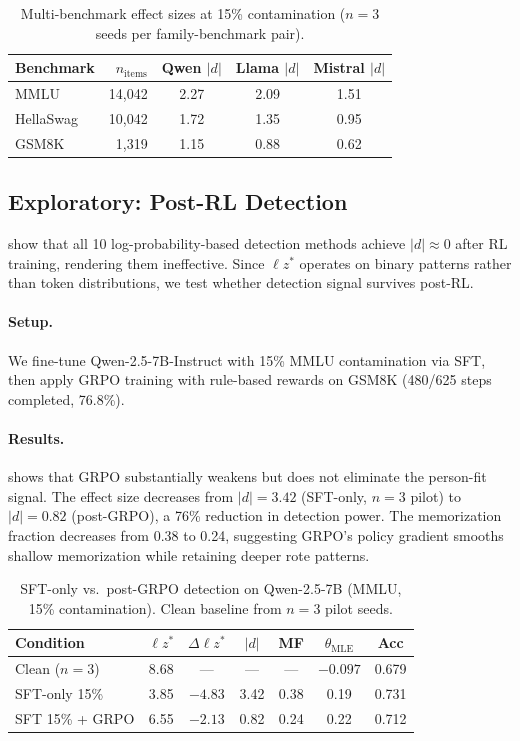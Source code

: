 \documentclass[11pt,a4paper]{article}
\begin{document}
\begin{table}[t]
\centering
\caption{Multi-benchmark effect sizes at 15\% contamination ($n{=}3$ seeds per family-benchmark pair).}
\label{tab:multi-bench}
\small
\begin{tabular}{lrccc}
\toprule
\textbf{Benchmark} & $n_{\text{items}}$ & \textbf{Qwen} $|d|$ & \textbf{Llama} $|d|$ & \textbf{Mistral} $|d|$ \\
\midrule
MMLU & 14,042 & 2.27 & 2.09 & 1.51 \\
HellaSwag & 10,042 & 1.72 & 1.35 & 0.95 \\
GSM8K & 1,319 & 1.15 & 0.88 & 0.62 \\
\bottomrule
\end{tabular}
\end{table}

\subsection{Exploratory: Post-RL Detection}
\label{sec:post-rl}

\citet{wang2025rlcontam} show that all 10 log-probability-based detection methods achieve $|d|{\approx}0$ after RL training, rendering them ineffective.
Since $\ell z^*$ operates on binary patterns rather than token distributions, we test whether detection signal survives post-RL.

\paragraph{Setup.}
We fine-tune Qwen-2.5-7B-Instruct with 15\% MMLU contamination via SFT, then apply GRPO training with rule-based rewards on GSM8K (480/625 steps completed, 76.8\%).

\paragraph{Results.}
 shows that GRPO substantially weakens but does not eliminate the person-fit signal.
The effect size decreases from $|d|{=}3.42$ (SFT-only, $n{=}3$ pilot) to $|d|{=}0.82$ (post-GRPO), a 76\% reduction in detection power.
The memorization fraction decreases from 0.38 to 0.24, suggesting GRPO's policy gradient smooths shallow memorization while retaining deeper rote patterns.

\begin{table}[t]
\centering
\caption{SFT-only vs.\ post-GRPO detection on Qwen-2.5-7B (MMLU, 15\% contamination). Clean baseline from $n{=}3$ pilot seeds.}
\label{tab:post-rl}
\small
\begin{tabular}{lcccccc}
\toprule
\textbf{Condition} & $\ell z^*$ & $\Delta \ell z^*$ & $|d|$ & \textbf{MF} & $\theta_{\text{MLE}}$ & \textbf{Acc} \\
\midrule
Clean ($n{=}3$) & 8.68 & --- & --- & --- & $-0.097$ & 0.679 \\
SFT-only 15\% & 3.85 & $-4.83$ & 3.42 & 0.38 & 0.19 & 0.731 \\
SFT 15\% + GRPO & 6.55 & $-2.13$ & 0.82 & 0.24 & 0.22 & 0.712 \\
\bottomrule
\end{tabular}
\end{table}
\end{document}
